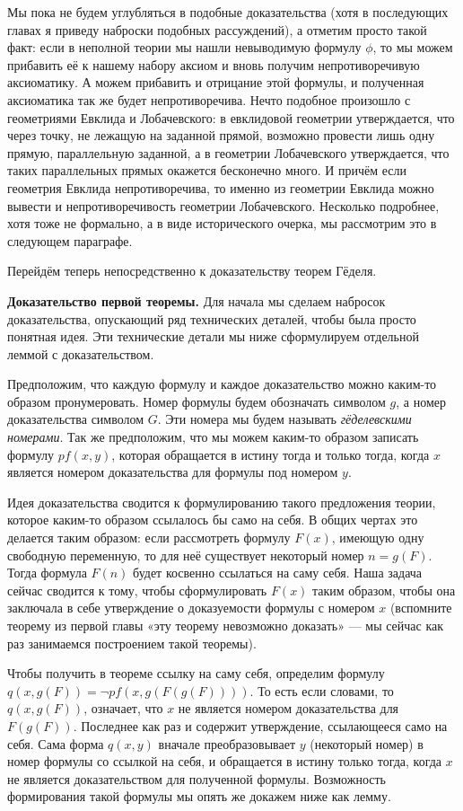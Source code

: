 Мы пока не будем углубляться в подобные доказательства (хотя в последующих главах я приведу наброски подобных рассуждений), а отметим просто такой факт: если в неполной теории мы нашли невыводимую формулу $\phi$, то мы можем прибавить её к нашему набору аксиом и вновь получим непротиворечивую аксиоматику. А можем прибавить и отрицание этой формулы, и полученная аксиоматика так же будет непротиворечива. Нечто подобное произошло с геометриями Евклида и Лобачевского: в евклидовой геометрии утверждается, что через точку, не лежащую на заданной прямой, возможно провести лишь одну прямую, параллельную заданной, а в геометрии Лобачевского утверждается, что таких параллельных прямых окажется бесконечно много. И причём если геометрия Евклида непротиворечива, то именно из геометрии Евклида можно вывести и непротиворечивость геометрии Лобачевского. Несколько подробнее, хотя тоже не формально, а в виде исторического очерка, мы рассмотрим это в следующем параграфе.

Перейдём теперь непосредственно к доказательству теорем Гёделя.

{\bfseries Доказательство первой теоремы.} Для начала мы сделаем набросок доказательства, опускающий ряд технических деталей, чтобы была просто понятная идея. Эти технические детали мы ниже сформулируем отдельной леммой с доказательством.

Предположим, что каждую формулу и каждое доказательство можно каким-то образом пронумеровать. Номер формулы  будем обозначать символом $g$, а номер доказательства символом $G$. Эти номера мы будем называть {\slshape гёделевскими номерами}. Так же предположим, что мы можем каким-то образом записать формулу $pf(x, y)$, которая обращается в истину тогда и только тогда, когда $x$ является номером доказательства для формулы под номером $y$.

Идея доказательства  сводится к формулированию такого предложения теории, которое каким-то образом ссылалось бы само на себя. В общих чертах это делается таким образом: если рассмотреть формулу $F(x)$, имеющую одну свободную переменную, то для неё существует некоторый номер $n=g(F)$. Тогда формула $F(n)$ будет косвенно ссылаться на саму себя. Наша задача сейчас сводится к тому, чтобы сформулировать $F(x)$ таким образом, чтобы она заключала в себе утверждение о доказуемости формулы с номером $x$ (вспомните теорему из первой главы «эту теорему невозможно доказать» — мы сейчас как раз занимаемся построением такой теоремы).

Чтобы получить в теореме ссылку на саму себя, определим формулу $q(x, g(F)) = \neg pf(x, g(F(g(F))))$. То есть если словами, то $q(x, g(F))$, означает, что $x$ не является номером доказательства для $F(g(F))$. Последнее как раз и содержит утверждение, ссылающееся само на себя. Сама форма $q(x, y)$ вначале преобразовывает $y$ (некоторый номер) в номер формулы со ссылкой на себя, и обращается в истину только тогда, когда $x$ не является доказательством для полученной формулы. Возможность формирования такой формулы мы опять же докажем ниже как лемму.

